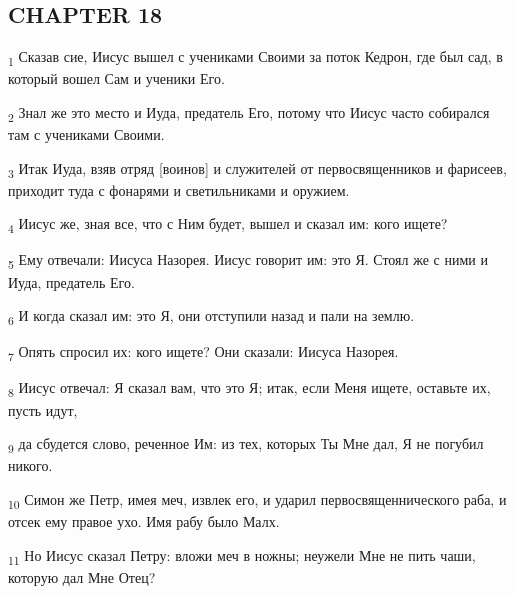\subsection{CHAPTER 18}
\begin{tcolorbox}
\textsubscript{1} Сказав сие, Иисус вышел с учениками Своими за поток Кедрон, где был сад, в который вошел Сам и ученики Его.
\end{tcolorbox}
\begin{tcolorbox}
\textsubscript{2} Знал же это место и Иуда, предатель Его, потому что Иисус часто собирался там с учениками Своими.
\end{tcolorbox}
\begin{tcolorbox}
\textsubscript{3} Итак Иуда, взяв отряд [воинов] и служителей от первосвященников и фарисеев, приходит туда с фонарями и светильниками и оружием.
\end{tcolorbox}
\begin{tcolorbox}
\textsubscript{4} Иисус же, зная все, что с Ним будет, вышел и сказал им: кого ищете?
\end{tcolorbox}
\begin{tcolorbox}
\textsubscript{5} Ему отвечали: Иисуса Назорея. Иисус говорит им: это Я. Стоял же с ними и Иуда, предатель Его.
\end{tcolorbox}
\begin{tcolorbox}
\textsubscript{6} И когда сказал им: это Я, они отступили назад и пали на землю.
\end{tcolorbox}
\begin{tcolorbox}
\textsubscript{7} Опять спросил их: кого ищете? Они сказали: Иисуса Назорея.
\end{tcolorbox}
\begin{tcolorbox}
\textsubscript{8} Иисус отвечал: Я сказал вам, что это Я; итак, если Меня ищете, оставьте их, пусть идут,
\end{tcolorbox}
\begin{tcolorbox}
\textsubscript{9} да сбудется слово, реченное Им: из тех, которых Ты Мне дал, Я не погубил никого.
\end{tcolorbox}
\begin{tcolorbox}
\textsubscript{10} Симон же Петр, имея меч, извлек его, и ударил первосвященнического раба, и отсек ему правое ухо. Имя рабу было Малх.
\end{tcolorbox}
\begin{tcolorbox}
\textsubscript{11} Но Иисус сказал Петру: вложи меч в ножны; неужели Мне не пить чаши, которую дал Мне Отец?
\end{tcolorbox}
